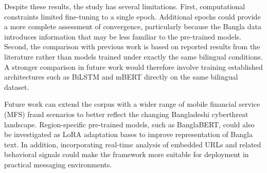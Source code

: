 \documentclass[journal]{IEEEtran}
\begin{document}
Despite these results, the study has several limitations. First, computational constraints limited fine-tuning to a single epoch. Additional epochs could provide a more complete assessment of convergence, particularly because the Bangla data introduces information that may be less familiar to the pre-trained models. Second, the comparison with previous work is based on reported results from the literature rather than models trained under exactly the same bilingual conditions. A stronger comparison in future work would therefore involve training established architectures such as BiLSTM and mBERT directly on the same bilingual dataset.

Future work can extend the corpus with a wider range of mobile financial service (MFS) fraud scenarios to better reflect the changing Bangladeshi cyberthreat landscape. Region-specific pre-trained models, such as BanglaBERT, could also be investigated as LoRA adaptation bases to improve representation of Bangla text. In addition, incorporating real-time analysis of embedded URLs and related behavioral signals could make the framework more suitable for deployment in practical messaging environments.






\end{document}
